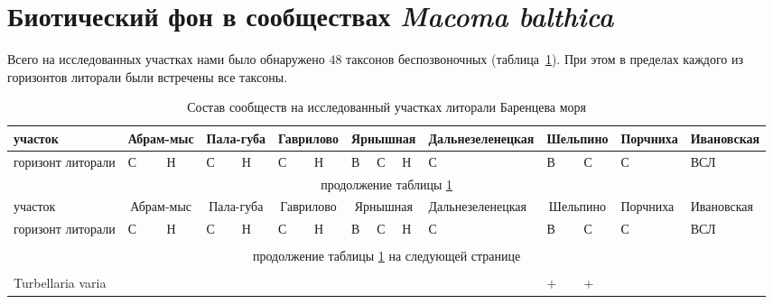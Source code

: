 \section{Биотический фон в сообществах {\it Macoma balthica}}
Всего на исследованных участках нами было обнаружено $48$ таксонов беспозвоночных (таблица~\ref{tab:Barents_species}). 
При этом в пределах каждого из горизонтов литорали были встречены все таксоны. 
\begin{footnotesize}
\begin{longtable}{|p{2cm}|p{0.4cm}p{0.4cm}|p{0.4cm}p{0.4cm}|p{0.4cm}p{0.4cm}|p{0.35cm}p{0.35cm}p{0.35cm}|p{1cm}|p{0.5cm}p{0.5cm}|p{1cm}|p{1cm}|}
\caption{Состав сообществ на исследованный участках литорали Баренцева моря}
\label{tab:Barents_species}
\\ \hline
участок                     & \multicolumn{2}{c|}{Абрам-мыс} & \multicolumn{2}{c|}{Пала-губа} & \multicolumn{2}{c|}{Гав\-ри\-ло\-во} & \multicolumn{3}{c|}{Яр\-ныш\-ная} & Дальне\-зе\-ле\-нец\-кая & \multicolumn{2}{c|}{Шель\-пи\-но} & Порч\-ни\-ха & Ива\-нов\-ская \\ \hline
горизонт литорали & С       & Н       & С       & Н       & С       & Н   & В    & С    & Н    & С           & В    & С    & С    & ВСЛ        \\ \hline \endfirsthead
	\hline
	\multicolumn{15}{|c|}{продолжение таблицы \ref{tab:Barents_species}} \\ \hline
участок                     & \multicolumn{2}{c|}{Абрам-мыс} & \multicolumn{2}{c|}{Пала-губа} & \multicolumn{2}{c|}{Гав\-ри\-ло\-во} & \multicolumn{3}{c|}{Яр\-ныш\-ная} & Дальне\-зе\-ле\-нец\-кая & \multicolumn{2}{c|}{Шель\-пи\-но} & Порч\-ни\-ха & Ива\-нов\-ская \\ \hline
горизонт литорали & С       & Н       & С       & Н       & С       & Н   & В    & С    & Н    & С           & В    & С    & С    & ВСЛ        \\ \hline
	\\ \hline \endhead
	\hline 
	\multicolumn{15}{|c|}{продолжение таблицы \ref{tab:Barents_species} на следующей странице}
	\\ \hline \endfoot
	 \endlastfoot
\multicolumn{15}{|c|}{Turbellaria} \\ \hline
 Turbellaria varia         &           &           &           &           &           &           &          &          &          &                 & +        & +        &          &            \\ \hline

\end{longtable}
\end{footnotesize}
